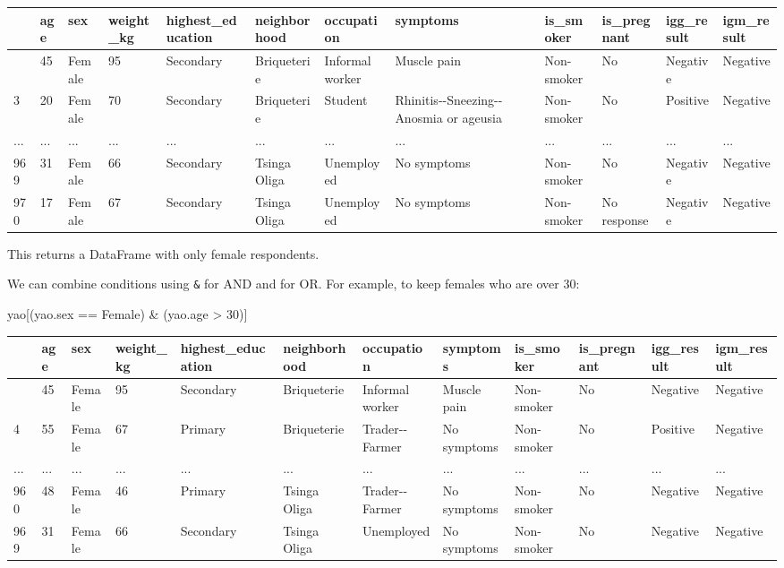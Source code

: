 \documentclass[
  letterpaper,
  DIV=11,
  numbers=noendperiod]{scrreprt}
\newenvironment{Shaded}{\begin{snugshade}}{\end{snugshade}}
\newcommand{\DecValTok}[1]{\textcolor[rgb]{0.68,0.00,0.00}{#1}}
\newcommand{\NormalTok}[1]{\textcolor[rgb]{0.00,0.23,0.31}{#1}}
\newcommand{\OperatorTok}[1]{\textcolor[rgb]{0.37,0.37,0.37}{#1}}
\newcommand{\StringTok}[1]{\textcolor[rgb]{0.13,0.47,0.30}{#1}}
\begin{document}
\begin{longtable}[]{@{}llllllllllll@{}}
\toprule\noalign{}
& age & sex & weight\_kg & highest\_education & neighborhood &
occupation & symptoms & is\_smoker & is\_pregnant & igg\_result &
igm\_result \\
\midrule\noalign{}
\endhead
\bottomrule\noalign{}
\endlastfoot
0 & 45 & Female & 95 & Secondary & Briqueterie & Informal worker &
Muscle pain & Non-smoker & No & Negative & Negative \\
3 & 20 & Female & 70 & Secondary & Briqueterie & Student &
Rhinitis-\/-Sneezing-\/-Anosmia or ageusia & Non-smoker & No & Positive
& Negative \\
... & ... & ... & ... & ... & ... & ... & ... & ... & ... & ... & ... \\
969 & 31 & Female & 66 & Secondary & Tsinga Oliga & Unemployed & No
symptoms & Non-smoker & No & Negative & Negative \\
970 & 17 & Female & 67 & Secondary & Tsinga Oliga & Unemployed & No
symptoms & Non-smoker & No response & Negative & Negative \\
\end{longtable}

This returns a DataFrame with only female respondents.

We can combine conditions using \texttt{\&} for AND and
\texttt{\textbar{}} for OR. For example, to keep females who are over
30:

\begin{Shaded}
\begin{Highlighting}[]
\NormalTok{yao[(yao.sex }\OperatorTok{==} \StringTok{\textquotesingle{}Female\textquotesingle{}}\NormalTok{) }\OperatorTok{\&}\NormalTok{ (yao.age }\OperatorTok{\textgreater{}} \DecValTok{30}\NormalTok{)]}
\end{Highlighting}
\end{Shaded}

\begin{longtable}[]{@{}llllllllllll@{}}
\toprule\noalign{}
& age & sex & weight\_kg & highest\_education & neighborhood &
occupation & symptoms & is\_smoker & is\_pregnant & igg\_result &
igm\_result \\
\midrule\noalign{}
\endhead
\bottomrule\noalign{}
\endlastfoot
0 & 45 & Female & 95 & Secondary & Briqueterie & Informal worker &
Muscle pain & Non-smoker & No & Negative & Negative \\
4 & 55 & Female & 67 & Primary & Briqueterie & Trader-\/-Farmer & No
symptoms & Non-smoker & No & Positive & Negative \\
... & ... & ... & ... & ... & ... & ... & ... & ... & ... & ... & ... \\
960 & 48 & Female & 46 & Primary & Tsinga Oliga & Trader-\/-Farmer & No
symptoms & Non-smoker & No & Negative & Negative \\
969 & 31 & Female & 66 & Secondary & Tsinga Oliga & Unemployed & No
symptoms & Non-smoker & No & Negative & Negative \\
\end{longtable}
\end{document}
